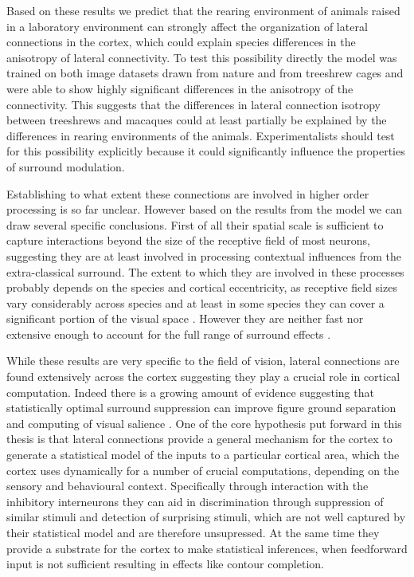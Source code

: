Based on these results we predict that the rearing environment of
animals raised in a laboratory environment can strongly affect the
organization of lateral connections in the cortex, which could explain
species differences in the anisotropy of lateral connectivity. To test
this possibility directly the model was trained on both image datasets
drawn from nature and from treeshrew cages and were able to show
highly significant differences in the anisotropy of the
connectivity. This suggests that the differences in lateral connection
isotropy between treeshrews \citep{Bosking1997} and macaques
\citep{Angelucci2002} could at least partially be explained by the
differences in rearing environments of the animals. Experimentalists
should test for this possibility explicitly because it could
significantly influence the properties of surround modulation.

Establishing to what extent these connections are involved in higher
order processing is so far unclear. However based on the results from
the model we can draw several specific conclusions. First of all their
spatial scale is sufficient to capture interactions beyond the size of
the receptive field of most neurons, suggesting they are at least
involved in processing contextual influences from the extra-classical
surround. The extent to which they are involved in these processes
probably depends on the species and cortical eccentricity, as
receptive field sizes vary considerably across species and at least in
some species they can cover a significant portion of the visual space
\citep{Bosking1997}. However they are neither fast nor extensive
enough to account for the full range of surround effects
\citep{Bair2003}.

While these results are very specific to the field of vision, lateral
connections are found extensively across the cortex suggesting they
play a crucial role in cortical computation. Indeed there is a growing
amount of evidence suggesting that statistically optimal surround
suppression can improve figure ground separation and computing of
visual salience \citep{Coen2012, Coen2015}. One of the core hypothesis
put forward in this thesis is that lateral connections provide a
general mechanism for the cortex to generate a statistical model of
the inputs to a particular cortical area, which the cortex uses
dynamically for a number of crucial computations, depending on the
sensory and behavioural context. Specifically through interaction with
the inhibitory interneurons they can aid in discrimination through
suppression of similar stimuli and detection of surprising stimuli,
which are not well captured by their statistical model and are
therefore unsupressed. At the same time they provide a substrate for
the cortex to make statistical inferences, when feedforward input is
not sufficient resulting in effects like contour completion.

